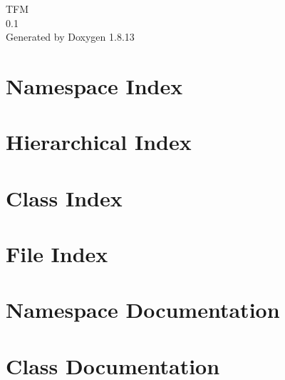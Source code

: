 \documentclass[twoside]{book}
\newcommand{\+}{\discretionary{\mbox{\scriptsize$\hookleftarrow$}}{}{}}
\newcommand{\clearemptydoublepage}{%
  \newpage{\pagestyle{empty}\cleardoublepage}%
}
\begin{document}
\begin{titlepage}
\vspace*{7cm}
\begin{center}%
{\Large T\+FM \\[1ex]\large 0.\+1 }\\
\vspace*{1cm}
{\large Generated by Doxygen 1.8.13}\\
\end{center}
\end{titlepage}
\clearemptydoublepage
{}
\tableofcontents
\clearemptydoublepage
{}

\chapter{Namespace Index}

\chapter{Hierarchical Index}

\chapter{Class Index}

\chapter{File Index}

\chapter{Namespace Documentation}

\chapter{Class Documentation}

































\end{document}
